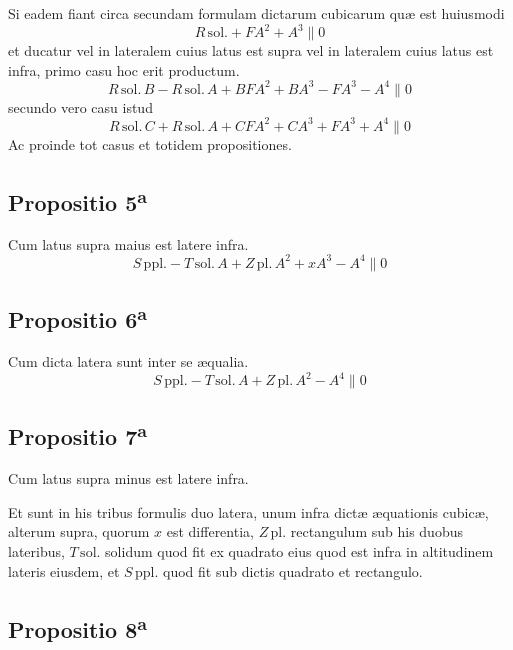 \documentclass[11pt,a4paper]{article}
\begin{document}
Si eadem fiant circa secundam formulam dictarum cubicarum quæ est huiusmodi
\[ R\,\mathrm{sol.} + F A^2 + A^3 \parallel 0 \]
et ducatur vel in lateralem cuius latus est supra vel in lateralem cuius latus est infra, primo casu hoc erit productum.
\[ R\,\mathrm{sol.}\,B - R\,\mathrm{sol.}\,A + B F A^2 + B A^3 - F A^3 - A^4 \parallel 0 \]
secundo vero casu istud
\[ R\,\mathrm{sol.}\,C + R\,\mathrm{sol.}\,A + C F A^2 + C A^3 + F A^3 + A^4 \parallel 0 \]
Ac proinde tot casus et totidem propositiones.

\subsection*{Propositio 5\textsuperscript{a}}

Cum latus supra maius est latere infra.
\[ S\,\mathrm{ppl.} - T\,\mathrm{sol.}\,A + Z\,\mathrm{pl.}\,A^2 + x A^3 - A^4 \parallel 0 \]

\subsection*{Propositio 6\textsuperscript{a}}

Cum dicta latera sunt inter se æqualia.
\[ S\,\mathrm{ppl.} - T\,\mathrm{sol.}\,A + Z\,\mathrm{pl.}\,A^2 - A^4 \parallel 0 \]

\subsection*{Propositio 7\textsuperscript{a}}

Cum latus supra minus est latere infra.

Et sunt in his tribus formulis duo latera, unum infra dictæ æquationis cubicæ, alterum supra, quorum $x$ est differentia, $Z\,\mathrm{pl.}$ rectangulum sub his duobus lateribus, $T\,\mathrm{sol.}$ solidum quod fit ex quadrato eius quod est infra in altitudinem lateris eiusdem, et $S\,\mathrm{ppl.}$ quod fit sub dictis quadrato et rectangulo.

\subsection*{Propositio 8\textsuperscript{a}}
\end{document}
